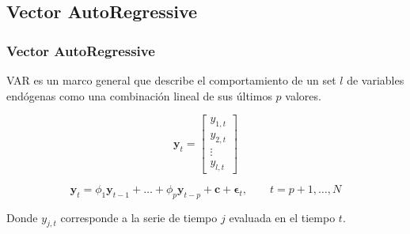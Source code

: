 \documentclass{beamer}
\begin{document}
        \subsection{Vector AutoRegressive}
            \begin{frame}
            \frametitle{Vector AutoRegressive}
            VAR es un marco general que describe el comportamiento de un set $l$ de
            variables endógenas como una combinación lineal de sus últimos $p$ valores.

            \begin{equation}
            \label{eq:variables}
            \mathbf{y}_t = 
            \begin{bmatrix} y_{1,t} \\
            y_{2,t} \\
            \vdots \\
            y_{l,t}
            \end{bmatrix}
            \end{equation}

            \begin{equation}
            \label{eq:var}
             \mathbf{y}_t = \phi_1 \mathbf{y}_{t-1}  + \dots +   \phi_p\mathbf{y}_{t-p}
             + \mathbf{c} + \mathbf{\epsilon}_t, \qquad t=p+1, \dots, N
             \end{equation}
            
            \noindent Donde $y_{j,t}$ corresponde a la serie de tiempo $j$ evaluada en el
            tiempo $t$.
            \end{frame}
\end{document}
